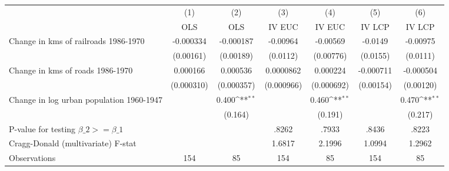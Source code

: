 {
\def\sym#1{\ifmmode^{#1}\else\(^{#1}\)\fi}
\begin{tabular}{l*{6}{c}}
\hline\hline
                &\multicolumn{1}{c}{(1)}&\multicolumn{1}{c}{(2)}&\multicolumn{1}{c}{(3)}&\multicolumn{1}{c}{(4)}&\multicolumn{1}{c}{(5)}&\multicolumn{1}{c}{(6)}\\
                &\multicolumn{1}{c}{OLS}&\multicolumn{1}{c}{OLS}&\multicolumn{1}{c}{IV EUC}&\multicolumn{1}{c}{IV EUC}&\multicolumn{1}{c}{IV LCP}&\multicolumn{1}{c}{IV LCP}\\
\hline
Change in kms of railroads 1986-1970&-0.000334         &-0.000187         & -0.00964         & -0.00569         &  -0.0149         & -0.00975         \\
                &(0.00161)         &(0.00189)         & (0.0112)         &(0.00776)         & (0.0155)         & (0.0111)         \\
[1em]
Change in kms of roads 1986-1970& 0.000166         & 0.000536         &0.0000862         & 0.000224         &-0.000711         &-0.000504         \\
                &(0.000310)         &(0.000357)         &(0.000966)         &(0.000692)         &(0.00154)         &(0.00120)         \\
[1em]
Change in log urban population 1960-1947&                  &    0.400\sym{**} &                  &    0.460\sym{**} &                  &    0.470\sym{**} \\
                &                  &  (0.164)         &                  &  (0.191)         &                  &  (0.217)         \\
\hline
P-value for testing $\beta\_{2} >= \beta\_{1}$&                  &                  &    .8262         &    .7933         &    .8436         &    .8223         \\
Cragg-Donald (multivariate) F-stat&                  &                  &   1.6817         &   2.1996         &   1.0994         &   1.2962         \\
Observations    &      154         &       85         &      154         &       85         &      154         &       85         \\
\hline\hline
\end{tabular}
}
